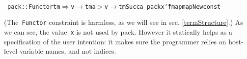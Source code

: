 \documentclass[9pt,authoryear]{sigplanconf}
\begin{document}
%
%
%
~\\~\vphantom{$\{$}\texttt{pack}\texttt{\mbox{\hspace{0.50em}}}\texttt{{:}{:}}\texttt{\mbox{\hspace{0.50em}}}\texttt{Functor}\texttt{\mbox{\hspace{0.50em}}}\texttt{tm}\texttt{\mbox{\hspace{0.50em}}}\texttt{$ \Rightarrow $}\texttt{\mbox{\hspace{0.50em}}}\texttt{v}\texttt{\mbox{\hspace{0.50em}}}\texttt{$ \rightarrow $}\texttt{\mbox{\hspace{0.50em}}}\texttt{tm}\texttt{\mbox{\hspace{0.50em}}}\texttt{\makebox[1.22ex][l]{$ {(} $}}\texttt{a}\texttt{\mbox{\hspace{0.50em}}}\texttt{$ \vartriangleright $}\texttt{\mbox{\hspace{0.50em}}}\texttt{v}\texttt{\makebox[1.22ex][r]{$ {)} $}}\texttt{\mbox{\hspace{0.50em}}}\texttt{$ \rightarrow $}\texttt{\mbox{\hspace{0.50em}}}\texttt{tm}\texttt{\mbox{\hspace{0.50em}}}\texttt{\makebox[1.22ex][l]{$ {(} $}}\texttt{Succ}\texttt{\mbox{\hspace{0.50em}}}\texttt{a}\texttt{\makebox[1.22ex][r]{$ {)} $}}\texttt{{\nopagebreak \newline%
}\vphantom{$\{$}}\texttt{pack}\texttt{\mbox{\hspace{0.50em}}}\texttt{x}\texttt{\mbox{\hspace{0.50em}}}\texttt{{\char `\=}}\texttt{\mbox{\hspace{0.50em}}}\texttt{fmap}\texttt{\mbox{\hspace{0.50em}}}\texttt{\makebox[1.22ex][l]{$ {(} $}}\texttt{mapNew}\texttt{\mbox{\hspace{0.50em}}}\texttt{\makebox[1.22ex][l]{$ {(} $}}\texttt{const}\texttt{\mbox{\hspace{0.50em}}}\texttt{\makebox[1.22ex][l]{$ {(} $}}\texttt{\makebox[1.22ex][r]{$ {)} $}}\texttt{\makebox[1.22ex][r]{$ {)} $}}\texttt{\makebox[1.22ex][r]{$ {)} $}}\texttt{{\nopagebreak \newline%
}\vphantom{$\{$}}%


%
(The{~}\texttt{Functor} constraint is harmless, as we will see in sec.
    \ref{termStructure}.) As we can see, the value{~}\texttt{x} is not used
    by pack. However it statically helps as a specification of the
    user intention{:} it makes sure the programmer relies on host-level
    variable names, and not indices.%
\end{document}
